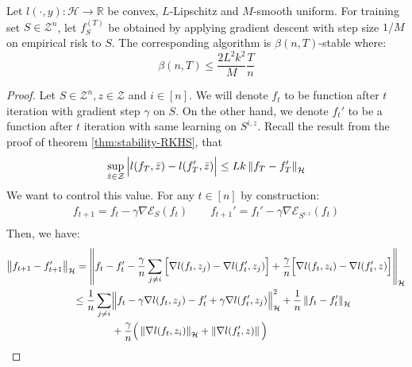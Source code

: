 \begin{theorem}
    Let $l(\cdot, y):\mathcal{H}\rightarrow \mathbb{R}$ be convex, $L$-Lipschitz and $M$-smooth uniform. For training set $S\in\mathcal{Z}^n$, let $f^{(T)}_S$ be obtained by applying gradient descent with step size $1/M$ on empirical risk to $S$. The corresponding algorithm is $\beta(n, T)$-stable where:
    \begin{equation*}
        \beta(n, T) \le \frac{2L^2k^2}{M}\frac{T}{n}
    \end{equation*}
\end{theorem}
\begin{proof}
    Let $S\in\mathcal{Z}^n, z \in \mathcal{Z}$ and $i\in[n]$. We will denote $f_t$ to be function after $t$ iteration with gradient step $\gamma$ on $S$. On the other hand, we denote $f_t'$ to be a function after $t$ iteration with same learning on $S^{i, z}$. Recall the result from the proof of theorem \ref{thm:stability-RKHS}, that 
    \begin{equation*}
        \sup_{\bar{z}\in\mathcal{Z}}\Big| l(f_T, \bar{z}) - l(f_T', \bar{z}) \Big| \le Lk\left\lVert f_T - f_T'\right\rVert_\mathcal{H}
    \end{equation*}
    We want to control this value. For any $t\in[n]$ by construction:
    \begin{equation*}
    \begin{aligned}
        f_{t+1} = f_t - \gamma\nabla \mathcal{E}_S(f_t) \qquad f_{t+1}' = f_t' - \gamma\nabla \mathcal{E}_{S^{i, z}}(f_t) \\ 
    \end{aligned}
    \end{equation*}
    Then, we have:
    \begin{equation*}
    \begin{aligned}
        \norm{f_{t+1} - f_{t+1}'}_\mathcal{H} &= \norm{ f_t - f_t' - \frac{\gamma}{n}\sum_{j\ne i}\Big[\nabla l(f_t, z_j) -  \nabla l(f_t', z_j)\Big] + \frac{\gamma}{n} \Big[\nabla l(f_t, z_i) - \nabla l(f_t', z) \Big]}_\mathcal{H} \\
        &\begin{aligned}[t]
            \le \frac{1}{n}\sum_{j\ne i} &\Big\| f_t - \gamma \nabla l(f_t, z_j) - f_t' + \gamma \nabla l(f_t', z_j)  \Big\|^2_\mathcal{H} + \frac{1}{n}\norm{ f_t - f_t' }_\mathcal{H} \\
            &+ \frac{\gamma}{n}\Big( \norm{\nabla l(f_t, z_i)}_\mathcal{H} + \norm{\nabla l(f_t', z)} \Big) \\    
        \end{aligned} \\

\end{aligned}
\end{equation*}
\end{proof}
